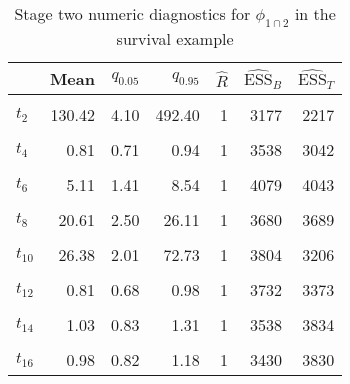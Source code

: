 \begin{table}

\caption{\label{tab:surv-stage-two-diag-phi-12}Stage two numeric diagnostics for $\phi_{1 \cap 2}$ in the survival example}
\centering
\begin{tabular}[t]{lrrrrrr}
\toprule
  & Mean & $q_{0.05}$ & $q_{0.95}$ & $\widehat{R}$ & $\widehat{\text{ESS}}_{B}$ & $\widehat{\text{ESS}}_{T}$\\
\midrule
\cellcolor{gray!6}{$t_{1}$} & \cellcolor{gray!6}{9.65} & \cellcolor{gray!6}{1.27} & \cellcolor{gray!6}{20.06} & \cellcolor{gray!6}{1} & \cellcolor{gray!6}{3320} & \cellcolor{gray!6}{3178}\\
$t_{2}$ & 130.42 & 4.10 & 492.40 & 1 & 3177 & 2217\\
\cellcolor{gray!6}{$t_{3}$} & \cellcolor{gray!6}{530.90} & \cellcolor{gray!6}{5.48} & \cellcolor{gray!6}{1224.97} & \cellcolor{gray!6}{1} & \cellcolor{gray!6}{3484} & \cellcolor{gray!6}{2764}\\
$t_{4}$ & 0.81 & 0.71 & 0.94 & 1 & 3538 & 3042\\
\cellcolor{gray!6}{$t_{5}$} & \cellcolor{gray!6}{0.85} & \cellcolor{gray!6}{0.73} & \cellcolor{gray!6}{1.02} & \cellcolor{gray!6}{1} & \cellcolor{gray!6}{3308} & \cellcolor{gray!6}{3251}\\
$t_{6}$ & 5.11 & 1.41 & 8.54 & 1 & 4079 & 4043\\
\cellcolor{gray!6}{$t_{7}$} & \cellcolor{gray!6}{1.14} & \cellcolor{gray!6}{1.00} & \cellcolor{gray!6}{1.31} & \cellcolor{gray!6}{1} & \cellcolor{gray!6}{3667} & \cellcolor{gray!6}{3337}\\
$t_{8}$ & 20.61 & 2.50 & 26.11 & 1 & 3680 & 3689\\
\cellcolor{gray!6}{$t_{9}$} & \cellcolor{gray!6}{0.90} & \cellcolor{gray!6}{0.75} & \cellcolor{gray!6}{1.10} & \cellcolor{gray!6}{1} & \cellcolor{gray!6}{3887} & \cellcolor{gray!6}{3967}\\
$t_{10}$ & 26.38 & 2.01 & 72.73 & 1 & 3804 & 3206\\
\cellcolor{gray!6}{$t_{11}$} & \cellcolor{gray!6}{0.91} & \cellcolor{gray!6}{0.72} & \cellcolor{gray!6}{1.18} & \cellcolor{gray!6}{1} & \cellcolor{gray!6}{3718} & \cellcolor{gray!6}{3444}\\
$t_{12}$ & 0.81 & 0.68 & 0.98 & 1 & 3732 & 3373\\
\cellcolor{gray!6}{$t_{13}$} & \cellcolor{gray!6}{103.47} & \cellcolor{gray!6}{4.03} & \cellcolor{gray!6}{191.34} & \cellcolor{gray!6}{1} & \cellcolor{gray!6}{3877} & \cellcolor{gray!6}{3913}\\
$t_{14}$ & 1.03 & 0.83 & 1.31 & 1 & 3538 & 3834\\
\cellcolor{gray!6}{$t_{15}$} & \cellcolor{gray!6}{169.33} & \cellcolor{gray!6}{6.67} & \cellcolor{gray!6}{682.46} & \cellcolor{gray!6}{1} & \cellcolor{gray!6}{3387} & \cellcolor{gray!6}{2032}\\
$t_{16}$ & 0.98 & 0.82 & 1.18 & 1 & 3430 & 3830\\
\bottomrule
\end{tabular}
\end{table}